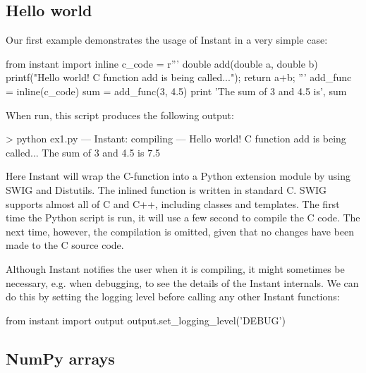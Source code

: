 \subsection{Hello world}
Our first example demonstrates the usage of Instant in a very simple case:
\begin{python}
from instant import inline
c_code = r'''
double add(double a, double b)
{
  printf("Hello world! C function add is being called...\n");
  return a+b;
}'''
add_func = inline(c_code)
sum = add_func(3, 4.5)
print 'The sum of 3 and 4.5 is', sum
\end{python}
When run, this script produces the following output:
\begin{progoutput}
 > python ex1.py
--- Instant: compiling ---
Hello world! C function add is being called...
The sum of 3 and 4.5 is 7.5
\end{progoutput}
Here Instant will wrap the C-function  into a Python
extension module by using SWIG and Distutils.  The inlined function is
written in standard C. SWIG supports almost all of C and C++,
including classes and templates.  The first time the Python script is
run, it will use a few second to compile the C code.  The next time,
however, the compilation is omitted, given that no changes have been
made to the C source code.


Although Instant notifies the user when it is compiling, it might
sometimes be necessary, e.g. when debugging, to see the details of the
Instant internals. We can do this by setting the logging level before
calling any other Instant functions:
\begin{python}
from instant import output
output.set_logging_level('DEBUG')
\end{python}

\subsection{NumPy arrays}

